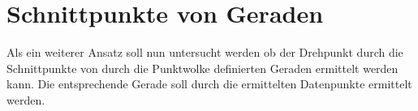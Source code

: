 






\section{Schnittpunkte von Geraden}\label{ch:schnittpunkt_gerade}

Als ein weiterer Ansatz soll nun untersucht werden ob der Drehpunkt durch die Schnittpunkte von durch die Punktwolke definierten Geraden ermittelt werden kann.
Die entsprechende Gerade soll durch die ermittelten Datenpunkte ermittelt werden.

